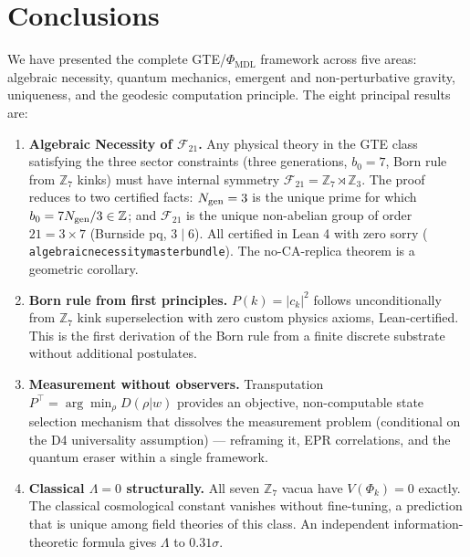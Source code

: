 \documentclass[11pt]{article}
\theoremstyle{remark}
\newcommand{\PHIMDL}{\Phi_{\mathrm{MDL}}}
\newcommand{\ZS}{\mathbb{Z}_7}
\newcommand{\ZZ}{\mathbb{Z}}
\newcommand{\lean}[1]{%
  \penalty-100
  \begingroup\def\_{\textunderscore\allowbreak}\texttt{#1}\endgroup}
\newcommand{\FTT}{\mathcal{F}_{21}}
\begin{document}
\section{Conclusions}
\label{sec:conclusions}

We have presented the complete GTE/$\PHIMDL$ framework across five areas:
algebraic necessity, quantum mechanics, emergent and non-perturbative gravity,
uniqueness, and the geodesic computation principle.
The eight principal results are:

\begin{enumerate}[noitemsep]
\item \textbf{Algebraic Necessity of $\FTT$.}
  Any physical theory in the GTE class satisfying the three sector constraints
  (three generations, $b_0=7$, Born rule from $\ZS$ kinks) must have internal
  symmetry $\FTT = \ZS\rtimes\ZZ_3$.  The proof reduces to two certified facts:
  $N_{\rm gen}=3$ is the unique prime for which $b_0=7N_{\rm gen}/3\in\mathbb{Z}$;
  and $\FTT$ is the unique non-abelian group of order $21=3\times7$ (Burnside pq,
  $3\mid6$). All certified in Lean 4 with zero sorry
  (\lean{algebraic\_necessity\_master\_bundle}).
  The no-CA-replica theorem is a geometric corollary.

\item \textbf{Born rule from first principles.}
  $P(k) = |c_k|^2$ follows unconditionally from $\ZS$ kink superselection
  with zero custom physics axioms, Lean-certified.  This is the first
  derivation of the Born rule from a finite discrete substrate without
  additional postulates.

\item \textbf{Measurement without observers.}
  Transputation $P^\top = \arg\min_\rho D(\rho|w)$ provides an objective,
  non-computable state selection mechanism that dissolves the measurement
  problem (conditional on the D4 universality assumption) --- reframing it,
  EPR correlations, and the quantum eraser within a single framework.

\item \textbf{Classical $\Lambda = 0$ structurally.}
  All seven $\ZS$ vacua have $V(\Phi_k) = 0$ exactly.  The classical
  cosmological constant vanishes without fine-tuning, a prediction that is
  unique among field theories of this class.  An independent
  information-theoretic formula gives $\Lambda$ to $0.31\sigma$.


\end{enumerate}
\end{document}
